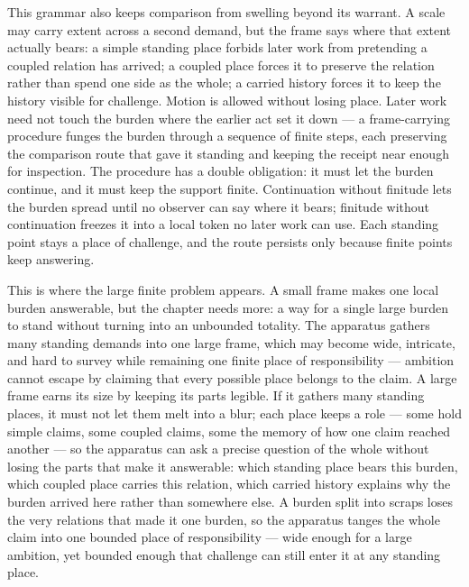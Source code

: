 This grammar also keeps comparison from swelling beyond its warrant. A scale may carry extent across a second demand, but the frame says where that extent actually bears: a simple standing place forbids later work from pretending a coupled relation has arrived; a coupled place forces it to preserve the relation rather than spend one side as the whole; a carried history forces it to keep the history visible for challenge. Motion is allowed without losing place. Later work need not touch the burden where the earlier act set it down --- a frame-carrying procedure funges the burden through a sequence of finite steps, each preserving the comparison route that gave it standing and keeping the receipt near enough for inspection. The procedure has a double obligation: it must let the burden continue, and it must keep the support finite. Continuation without finitude lets the burden spread until no observer can say where it bears; finitude without continuation freezes it into a local token no later work can use. Each standing point stays a place of challenge, and the route persists only because finite points keep answering.

This is where the large finite problem appears. A small frame makes one local burden answerable, but the chapter needs more: a way for a single large burden to stand without turning into an unbounded totality. The apparatus gathers many standing demands into one large frame, which may become wide, intricate, and hard to survey while remaining one finite place of responsibility --- ambition cannot escape by claiming that every possible place belongs to the claim. A large frame earns its size by keeping its parts legible. If it gathers many standing places, it must not let them melt into a blur; each place keeps a role --- some hold simple claims, some coupled claims, some the memory of how one claim reached another --- so the apparatus can ask a precise question of the whole without losing the parts that make it answerable: which standing place bears this burden, which coupled place carries this relation, which carried history explains why the burden arrived here rather than somewhere else. A burden split into scraps loses the very relations that made it one burden, so the apparatus tanges the whole claim into one bounded place of responsibility --- wide enough for a large ambition, yet bounded enough that challenge can still enter it at any standing place.

